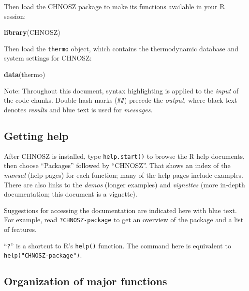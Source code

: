 \documentclass[]{tufte-handout}
\newenvironment{Shaded}{}{}
\newcommand{\KeywordTok}[1]{\textcolor[rgb]{0.00,0.44,0.13}{\textbf{#1}}}
\newcommand{\NormalTok}[1]{#1}
\begin{document}
Then load the CHNOSZ package to make its functions available in your R
session:

\begin{Shaded}
\begin{Highlighting}[]
\KeywordTok{library}\NormalTok{(CHNOSZ)}
\end{Highlighting}
\end{Shaded}

Then load the \texttt{thermo} object, which contains the thermodynamic
database and system settings for CHNOSZ:

\begin{Shaded}
\begin{Highlighting}[]
\KeywordTok{data}\NormalTok{(thermo)}
\end{Highlighting}
\end{Shaded}

Note: Throughout this document, syntax highlighting is applied to the
\emph{input} of the code chunks. Double hash marks (\texttt{\#\#})
precede the \emph{output}, where black text denotes \emph{results} and
blue text is used for \emph{messages}.

\subsection{Getting help}\label{getting-help}

After CHNOSZ is installed, type {\texttt{help.start()}} to browse the R
help documents, then choose ``Packages'' followed by ``CHNOSZ''. That
shows an index of the \emph{manual} (help pages) for each function; many
of the help pages include examples. There are also links to the
\emph{demos} (longer examples) and \emph{vignettes} (more in-depth
documentation; this document is a vignette).

Suggestions for accessing the documentation are indicated here with
{blue text}. For example, read
{\texttt{?\textasciigrave{}CHNOSZ-package\textasciigrave{}}} to get an
overview of the package and a list of features.

\begin{marginfigure}
``\texttt{?}'' is a shortcut to R's \texttt{help()} function. The
command here is equivalent to {\texttt{help("CHNOSZ-package")}}.
\end{marginfigure}

\subsection{Organization of major
functions}\label{organization-of-major-functions}
\end{document}
